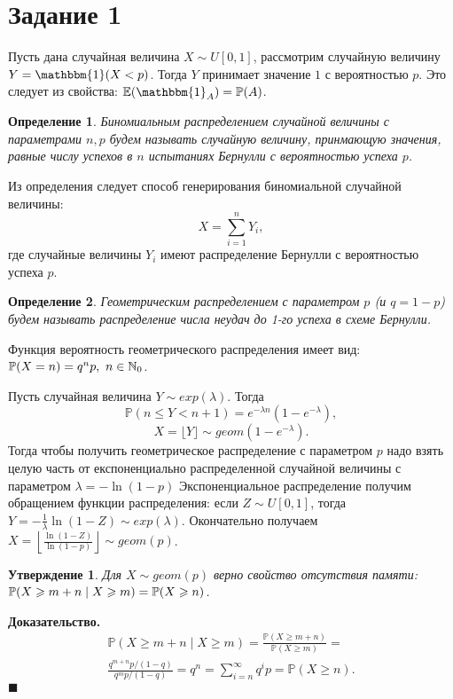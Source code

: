 \documentclass[12pt, a4paper]{article} %
\renewcommand{\le}{\leqslant}
\renewcommand{\ge}{\geqslant}
\def\Pro{\mathbb{P}} %
\def\Nat{\mathbb{N}} %
\def\Expec{\mathbb{E}} %
\def\Ind{\mathbbm{1}} %
\newcommand*{\hm}[1]{#1\nobreak\discretionary{}%
            {\hbox{\mathsurround=0pt #1}}{}}
\newtheorem{St}{Утверждение}
\newtheorem{Def}{Определение}
\newenvironment{Proof}{\par\textbf{Доказательство. }}
	{\hfill$\blacksquare$\vspace{0.1cm}}
\begin{document}


\tableofcontents

\newpage

\section*{Задание 1}

Пусть дана случайная величина $X \sim U[0, 1]$, рассмотрим случайную величину $Y = \Ind(X < p)$. 
Тогда $Y$ принимает значение $1$ с вероятностью $p$.
Это следует из свойства: $\Expec(\Ind_A) = \Pro(A)$.

\begin{Def}
    Биномиальным распределением случайной величины с параметрами $n, p$ 
    будем называть случайную величину, принмающую значения, равные числу успехов в  $n$ испытаниях Бернулли с вероятностью успеха $p$.
\end{Def}
Из определения следует способ генерирования биномиальной случайной величины:
\[
    X = \sum\limits_{i=1}^{n} Y_i, 
\] 
где случайные величины $Y_i$ имеют распределение Бернулли с вероятностью успеха  $p$.

\begin{Def}
    Геометрическим распределением с параметром $p$ (и $q = 1 - p$) будем 
    называть распределение числа неудач до 1-го успеха в схеме Бернулли.
\end{Def}
Функция вероятность геометрического распределения имеет вид: 
$\Pro (X \hm= n) = q^np,\ n \in \Nat_0$.

Пусть случайная величина $Y \sim exp(\lambda)$.
Тогда 
$$
\Pro(n \le Y < n + 1) = e^{-\lambda n} \left(1 - e^{-\lambda}\right),
$$
\[
   X = \lfloor Y \rfloor \sim geom(1 - e^{-\lambda}).
\] 
Тогда чтобы получить геометрическое распределение с параметром $p$ надо 
взять целую часть от експоненциально распределенной случайной величины с параметром  $\lambda = -\ln(1 - p)$
Экспоненциальное распределение получим обращением функции распределения:
если $Z \sim U[0, 1]$, тогда $Y = -\frac{1}{\lambda} \ln(1 - Z) \sim exp(\lambda)$.
Окончательно получаем $X = \left\lfloor \frac{\ln(1 - Z)}{\ln(1 - p)} \right\rfloor\sim geom(p)$.

\begin{St}
    Для $X \sim geom(p)$ верно свойство отсутствия памяти:
    $\Pro (X \ge m + n \mid X \ge m) \hm= \Pro(X \ge n)$.
\end{St}
\begin{Proof}
    \begin{multline*}
        \Pro (X \ge m + n \mid X \ge m) =
        \frac{\Pro(X \ge m + n)}{\Pro(X \ge m)} =\\
        \frac{q^{m + n}p / (1 - q)}{q^{m}p / (1 - q)} = q^{n} =
        \sum\limits_{i=n}^{\infty} q^{i}p = 
        \Pro(X \ge n).
    \end{multline*} 
\end{Proof} 
\end{document}
